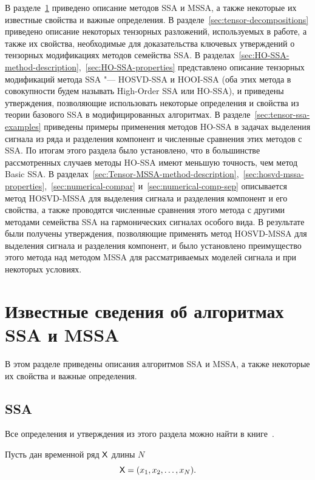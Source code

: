 \documentclass[specialist,
  substylefile=spbu.rtx,
subf,href,colorlinks=true, 12pt]{disser}
\theoremstyle{plain}
\theoremstyle{definition}
\theoremstyle{remark}
\begin{document}
В разделе~\ref{sec:known-results-ssa} приведено описание методов SSA и MSSA, а также некоторые их
известные свойства и важные определения.
В разделе~\ref{sec:tensor-decompositions} приведено описание некоторых тензорных разложений, используемых в работе,
а также их свойства, необходимые для доказательства ключевых утверждений о
тензорных модификациях методов семейства SSA.
В разделах~\ref{sec:HO-SSA-method-description},~\ref{sec:HO-SSA-properties} представлено описание
тензорных модификаций метода SSA "--- HOSVD-SSA и HOOI-SSA (оба этих метода в совокупности будем называть
High-Order SSA или HO-SSA), и приведены утверждения, позволяющие использовать некоторые определения и
свойства из теории базового SSA в модифицированных алгоритмах.
В разделе~\ref{sec:tensor-ssa-examples} приведены примеры применения методов HO-SSA в задачах выделения сигнала
из ряда и разделения компонент и численные сравнения этих методов с SSA.
По итогам этого раздела
было установлено,
что в большинстве рассмотренных случаев методы HO-SSA имеют меньшую точность, чем метод Basic SSA.
В разделах~\ref{sec:Tensor-MSSA-method-description},~\ref{sec:hosvd-mssa-properties},~\ref{sec:numerical-compar}
и~\ref{sec:numerical-comp-sep}
описывается метод HOSVD-MSSA для выделения сигнала и разделения компонент и его свойства, а также
проводятся численные сравнения этого метода с другими методами семейства SSA на гармонических сигналах особого вида.
В результате были получены утверждения, позволяющие применять метод HOSVD-MSSA для выделения сигнала и разделения компонент, и было установлено преимущество этого метода над методом MSSA для рассматриваемых моделей сигнала
и при некоторых условиях.
\newpage

\section{Известные сведения об алгоритмах SSA и MSSA}\label{sec:known-results-ssa}
В этом разделе приведены описания алгоритмов SSA и MSSA, а также некоторые их свойства и важные определения.


\subsection{SSA}\label{subsec:ssa}
Все определения и утверждения из этого раздела можно найти в книге~\cite{ssa}.

Пусть дан временной ряд $\mathsf{X}$ длины $N$
\[
  \mathsf{X}=(x_1,x_2,\ldots,x_N).
\]
\end{document}
